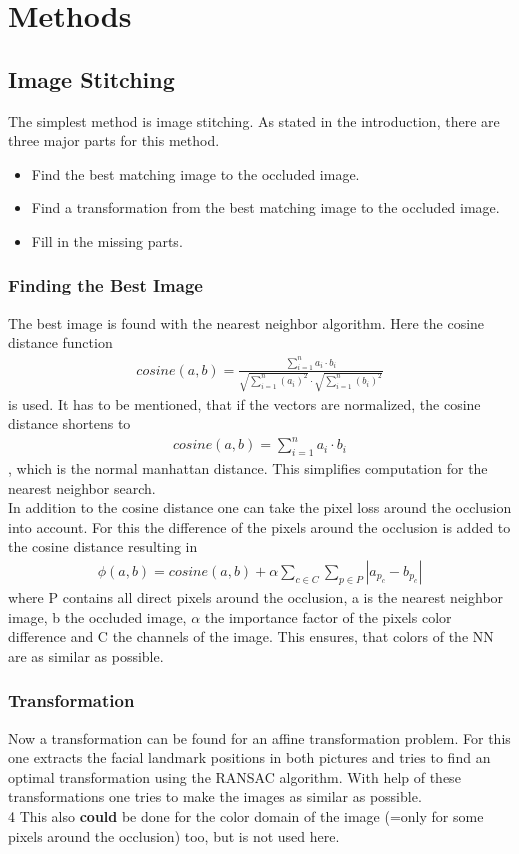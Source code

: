 \documentclass[
     11pt,         %
     a4paper,      %
     oneside,
     ]{article}
\begin{document}
\section{Methods}
\subsection{Image Stitching}
The simplest method is image stitching. As stated in the introduction, there are three major parts for this method.
\begin{itemize}
  \item Find the best matching image to the occluded image.
  \item Find a transformation from the best matching image to the occluded image.
  \item Fill in the missing parts.
\end{itemize}
\subsubsection{Finding the Best Image}
The best image is found with the nearest neighbor algorithm. Here the cosine distance function
\begin{align*}
  cosine(a,b) = \frac{\sum^n_{i=1} a_i \cdot b_i}{ \sqrt{\sum^n_{i=1} (a_i)^2} \cdot \sqrt{\sum^n_{i=1} (b_i)^2} }
\end{align*}
is used. It has to be mentioned, that if the vectors are normalized, the cosine distance shortens to
\begin{align*}
  cosine(a,b) = \sum^n_{i=1} a_i \cdot b_i
\end{align*}
, which is the normal manhattan distance. This simplifies computation for the nearest neighbor search. \\
In addition to the cosine distance one can take the pixel loss around the occlusion into account. For this the difference of the pixels around the occlusion is added to the cosine distance resulting in
\begin{align*}
  \phi(a,b)=cosine(a,b)+ \alpha \sum_{c \in C} \sum_{p \in P} |a_{p_c}-b_{p_c}|
\end{align*}
where P contains all direct pixels around the occlusion, a is the nearest neighbor image, b the occluded image, $\alpha$ the importance factor of the pixels color difference and C the channels of the image. This ensures, that colors of the NN are as similar as possible.

\subsubsection{Transformation}
Now a transformation can be found for an affine transformation problem. For this one extracts the facial landmark positions in both pictures and tries to find an optimal transformation using the RANSAC algorithm. With help of these transformations one tries to make the images as similar as possible.\\4
This also \textbf{could} be done for the color domain of the image (=only for some pixels around the occlusion) too, but is not used here.
\end{document}
